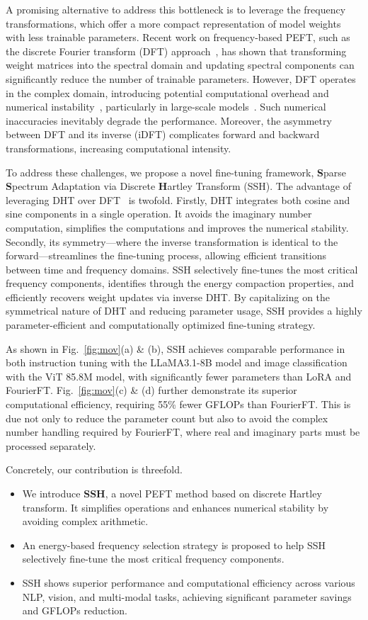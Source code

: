 A promising alternative to address this bottleneck is to leverage the frequency transformations, which offer a more compact representation of model weights with less trainable parameters. 
Recent work on frequency-based PEFT, such as the discrete Fourier transform (DFT) approach~\cite{gao2024parameter}, has shown that transforming weight matrices into the spectral domain and updating spectral components can significantly reduce the number of trainable parameters. However, DFT operates in the complex domain, introducing potential computational overhead and numerical instability~\cite{press2007numerical}, particularly in large-scale models~\cite{gao2024parameter}. 
Such numerical inaccuracies inevitably degrade the performance. Moreover, the asymmetry between DFT and its inverse (iDFT) complicates forward and backward transformations, increasing computational intensity. 

To address these challenges, we propose a novel fine-tuning framework, \textbf{S}parse \textbf{S}pectrum Adaptation via Discrete \textbf{H}artley Transform (SSH).
The advantage of leveraging DHT over DFT~\cite{gao2024parameter} is twofold.
Firstly, DHT integrates both cosine and sine components in a single operation. It avoids the imaginary number computation, simplifies the computations and improves the numerical stability.
Secondly, its symmetry—where the inverse transformation is identical to the forward—streamlines the fine-tuning process, allowing efficient transitions between time and frequency domains. 
SSH selectively fine-tunes the most critical frequency components, identifies through the energy compaction properties, and efficiently recovers weight updates via inverse DHT. By capitalizing on the symmetrical nature of DHT and reducing parameter usage, SSH provides a highly parameter-efficient and computationally optimized fine-tuning strategy.

As shown in Fig.~\ref{fig:mov}(a) \& (b), SSH achieves comparable performance in both instruction tuning with the LLaMA3.1-8B model and image classification with the ViT 85.8M model, with significantly fewer parameters than LoRA and FourierFT. 
Fig.~\ref{fig:mov}(c) \& (d) further demonstrate its superior computational efficiency, requiring 55\% fewer GFLOPs than FourierFT. 
This is due not only to reduce the parameter count but also to avoid the complex number handling required by FourierFT, where real and imaginary parts must be processed separately.

Concretely, our contribution is threefold.
\begin{itemize}
\item We introduce \textbf{SSH}, a novel PEFT method based on discrete Hartley transform.
It simplifies operations and enhances numerical stability by avoiding complex arithmetic.
\item An energy-based frequency selection strategy is proposed to help SSH selectively fine-tune the most critical frequency components.
\item SSH shows superior performance and computational efficiency across various NLP, vision, and multi-modal tasks, achieving significant parameter savings and GFLOPs reduction.
\end{itemize}